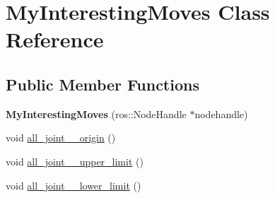 \hypertarget{class_my_interesting_moves}{\section{My\-Interesting\-Moves Class Reference}
\label{class_my_interesting_moves}
}
\subsection*{Public Member Functions}
\begin{DoxyCompactItemize}
\item 
\hypertarget{class_my_interesting_moves_aec8a013d087eb83aff717768d78bfdcd}{{\bfseries My\-Interesting\-Moves} (ros\-::\-Node\-Handle $\ast$nodehandle)}\label{class_my_interesting_moves_aec8a013d087eb83aff717768d78bfdcd}

\item 
void \hyperlink{class_my_interesting_moves_a2e0b90d80dcd1460dbd920b16efdcf34}{all\-\_\-joint\-\_\-\_\-origin} ()
\item 
void \hyperlink{class_my_interesting_moves_a4b8c87ee348898ec82cdada7deb0927b}{all\-\_\-joint\-\_\-\_\-upper\-\_\-limit} ()
\item 
void \hyperlink{class_my_interesting_moves_aa41777a05064fb157c825d183a475ed1}{all\-\_\-joint\-\_\-\_\-lower\-\_\-limit} ()
\end{DoxyCompactItemize}


